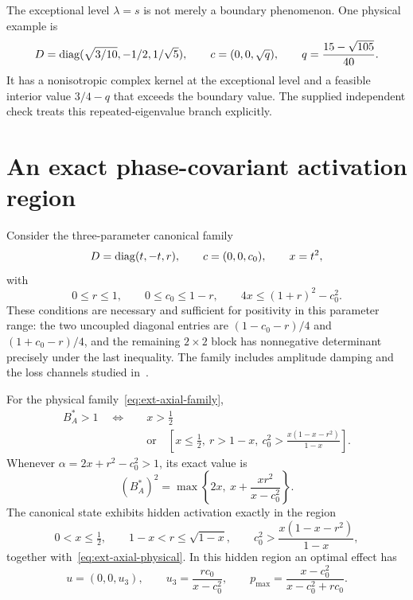 The exceptional level $\lambda=s$ is not merely a boundary phenomenon. One physical example is
\begin{equation}
 D=\operatorname{diag}(\sqrt{3/10},-1/2,1/\sqrt5),\qquad
 c=(0,0,\sqrt q),\qquad q=\frac{15-\sqrt{105}}{40}.
\end{equation}
It has a nonisotropic complex kernel at the exceptional level and a feasible interior value $3/4-q$ that exceeds the boundary value. The supplied independent check treats this repeated-eigenvalue branch explicitly.

\section{An exact phase-covariant activation region}
\label{sec:ext-axial}

Consider the three-parameter canonical family
\begin{equation}
 D=\operatorname{diag}(t,-t,r),\qquad c=(0,0,c_0),\qquad x=t^2,
 \label{eq:ext-axial-family}
\end{equation}
with
\begin{equation}
 0\le r\le1,\qquad 0\le c_0\le1-r,\qquad
 4x\le(1+r)^2-c_0^2.
 \label{eq:ext-axial-physical}
\end{equation}
These conditions are necessary and sufficient for positivity in this
parameter range: the two uncoupled diagonal entries are
$(1-c_0-r)/4$ and $(1+c_0-r)/4$, and the remaining $2\times2$
block has nonnegative determinant precisely under the last inequality.
The family includes amplitude damping and the loss channels studied
in~\cite{zhang}.

\begin{theorem}
\label{thm:ext-axial}
For the physical family~\eqref{eq:ext-axial-family},
\begin{equation}
 \boxed{\begin{aligned}
 B_A^*>1\quad\Longleftrightarrow\quad&
 x>\tfrac12\\[-2pt]
 &\text{or}\quad
 \left[x\le\tfrac12,\ r>1-x,\
 c_0^2>\frac{x(1-x-r^2)}{1-x}\right].
 \end{aligned}}
 \label{eq:ext-axial-activation}
\end{equation}
Whenever $\alpha=2x+r^2-c_0^2>1$, its exact value is
\begin{equation}
 (B_A^*)^2
 =\max\left\{2x,\ x+\frac{x r^2}{x-c_0^2}\right\}.
 \label{eq:ext-axial-value}
\end{equation}
The canonical state exhibits hidden activation exactly in the region
\begin{equation}
 0<x\le\tfrac12,\qquad
 1-x<r\le\sqrt{1-x},\qquad
 c_0^2>\frac{x(1-x-r^2)}{1-x},
 \label{eq:ext-axial-hidden}
\end{equation}
together with~\eqref{eq:ext-axial-physical}.
In this hidden region an optimal effect has
\begin{equation}
 u=(0,0,u_3),\qquad u_3=\frac{r c_0}{x-c_0^2},
 \qquad p_{\max}=\frac{x-c_0^2}{x-c_0^2+r c_0}.
 \label{eq:ext-axial-filter}
\end{equation}
\end{theorem}

